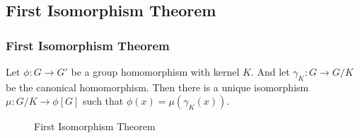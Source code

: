 \subsection{First Isomorphism Theorem}
\begin{frame}
	\frametitle{First Isomorphism Theorem}
	\begin{theorem}
		Let $\phi : G \to G'$ be a group homomorphism with kernel $K$.
		And let $\gamma_K : G \to G/K$ be the canonical homomorphism.
		Then there is a unique isomorphism $\mu : G/K \to \phi[G]$
		such that $\phi(x) = \mu(\gamma_K(x))$.
	\end{theorem}
	\begin{figure}
	\centering
	\caption{First Isomorphism Theorem}
\end{figure}
\end{frame}
